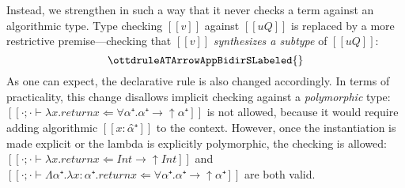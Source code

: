     Instead, we strengthen
    in such a way that it never checks a term against an algorithmic type. Type
    checking $[[v]]$ against $[[uQ]]$ is replaced by a more restrictive
    premise---checking that $[[v]]$ \emph{synthesizes a subtype} of $[[uQ]]$:
    $$ \ottdruleATArrowAppBidirSLabeled{} $$
    As one can expect, the declarative rule is also changed accordingly.
    In terms of practicality, this change disallows
    implicit checking against a \emph{polymorphic} type:
    $[[·;· ⊢ λx.return x ⇐ ∀α⁺.α⁺ → ↑α⁺]]$ is not allowed, because
    it would require adding algorithmic $[[x:α̂⁺]]$ to the context.
    However, once the instantiation is made explicit or the lambda is explicitly 
    polymorphic, the checking is allowed:
     $[[·;· ⊢ λx.return x ⇐ Int → ↑Int]]$ and 
     $[[·;· ⊢ Λα⁺.λx:α⁺.return x ⇐ ∀α⁺.α⁺ → ↑α⁺]]$ are both valid.
